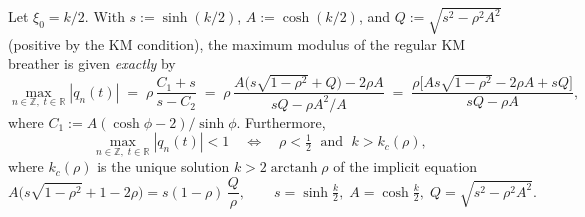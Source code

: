 \documentclass[10pt,a4paper]{amsart}
\begin{document}
\begin{proposition}\label{prop:main}
Let $\xi_0=k/2$.  With $s:=\sinh(k/2)$, $A:=\cosh(k/2)$, and
$Q:=\sqrt{s^2-\rho^2 A^2}$ (positive by the KM condition), the
maximum modulus of the regular KM breather is given \emph{exactly} by
\begin{equation}\label{eq:maxmod}
  \max_{n\in\mathbb{Z},\;t\in\mathbb{R}} |q_n(t)|
  \;=\;
  \rho\,\frac{C_1+s}{s-C_2}
  \;=\;
  \rho\,\frac{A\bigl(s\sqrt{1-\rho^2}+Q\bigr)-2\rho A}{sQ-\rho A^2/A}
  \;=\;
  \frac{\rho\bigl[As\sqrt{1-\rho^2}-2\rho A+sQ\bigr]}{sQ-\rho A},
\end{equation}
where $C_1:=A(\cosh\phi-2)/\sinh\phi$.  Furthermore,
\begin{equation}\label{eq:crit}
  \max_{n\in\mathbb{Z},\;t\in\mathbb{R}}|q_n(t)| < 1
  \quad\Longleftrightarrow\quad
  \rho < \tfrac{1}{2}
  \;\text{ and }\;
  k > k_c(\rho),
\end{equation}
where $k_c(\rho)$ is the unique solution $k>2\operatorname{arctanh}\rho$
of the implicit equation
\begin{equation}\label{eq:kstar}
  A\bigl(s\sqrt{1-\rho^2}+1-2\rho\bigr) = s(1-\rho)\,\frac{Q}{\rho},
  \qquad s=\sinh\tfrac{k}{2},\; A=\cosh\tfrac{k}{2},\; Q=\sqrt{s^2-\rho^2 A^2}.
\end{equation}
\end{proposition}
\end{document}
